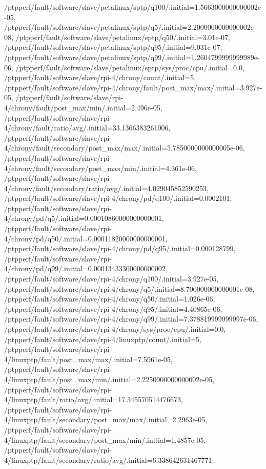 {    /ptpperf/fault/software/slave/petalinux/sptp/q100/.initial=1.5663000000000002e-05,
    /ptpperf/fault/software/slave/petalinux/sptp/q5/.initial=2.2000000000000002e-08,
    /ptpperf/fault/software/slave/petalinux/sptp/q50/.initial=3.01e-07,
    /ptpperf/fault/software/slave/petalinux/sptp/q95/.initial=9.031e-07,
    /ptpperf/fault/software/slave/petalinux/sptp/q99/.initial=1.2604799999999989e-06,
    /ptpperf/fault/software/slave/petalinux/sptp/sys/proc/cpu/.initial=0.0,
    /ptpperf/fault/software/slave/rpi-4/chrony/count/.initial=5,
    /ptpperf/fault/software/slave/rpi-4/chrony/fault/post_max/max/.initial=3.927e-05,
    /ptpperf/fault/software/slave/rpi-4/chrony/fault/post_max/min/.initial=2.496e-05,
    /ptpperf/fault/software/slave/rpi-4/chrony/fault/ratio/avg/.initial=33.1366383261006,
    /ptpperf/fault/software/slave/rpi-4/chrony/fault/secondary/post_max/max/.initial=5.7850000000000005e-06,
    /ptpperf/fault/software/slave/rpi-4/chrony/fault/secondary/post_max/min/.initial=4.361e-06,
    /ptpperf/fault/software/slave/rpi-4/chrony/fault/secondary/ratio/avg/.initial=4.029045852590253,
    /ptpperf/fault/software/slave/rpi-4/chrony/pd/q100/.initial=0.0002101,
    /ptpperf/fault/software/slave/rpi-4/chrony/pd/q5/.initial=0.00010860000000000001,
    /ptpperf/fault/software/slave/rpi-4/chrony/pd/q50/.initial=0.00011820000000000001,
    /ptpperf/fault/software/slave/rpi-4/chrony/pd/q95/.initial=0.000128799,
    /ptpperf/fault/software/slave/rpi-4/chrony/pd/q99/.initial=0.00013433300000000002,
    /ptpperf/fault/software/slave/rpi-4/chrony/q100/.initial=3.927e-05,
    /ptpperf/fault/software/slave/rpi-4/chrony/q5/.initial=8.700000000000001e-08,
    /ptpperf/fault/software/slave/rpi-4/chrony/q50/.initial=1.026e-06,
    /ptpperf/fault/software/slave/rpi-4/chrony/q95/.initial=4.40865e-06,
    /ptpperf/fault/software/slave/rpi-4/chrony/q99/.initial=7.378819999999997e-06,
    /ptpperf/fault/software/slave/rpi-4/chrony/sys/proc/cpu/.initial=0.0,
    /ptpperf/fault/software/slave/rpi-4/linuxptp/count/.initial=5,
    /ptpperf/fault/software/slave/rpi-4/linuxptp/fault/post_max/max/.initial=7.5961e-05,
    /ptpperf/fault/software/slave/rpi-4/linuxptp/fault/post_max/min/.initial=2.2250000000000002e-05,
    /ptpperf/fault/software/slave/rpi-4/linuxptp/fault/ratio/avg/.initial=17.345570514476673,
    /ptpperf/fault/software/slave/rpi-4/linuxptp/fault/secondary/post_max/max/.initial=2.2963e-05,
    /ptpperf/fault/software/slave/rpi-4/linuxptp/fault/secondary/post_max/min/.initial=1.4857e-05,
    /ptpperf/fault/software/slave/rpi-4/linuxptp/fault/secondary/ratio/avg/.initial=6.338642631467771,
}
